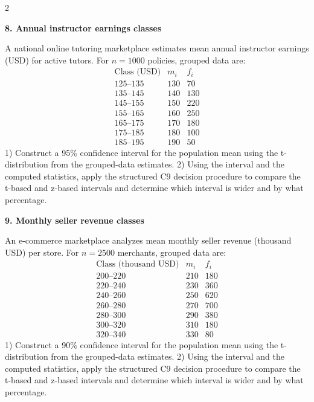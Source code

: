 \documentclass[12pt]{article}
\newcommand{\SubsectionBox}[1]{%
\noindent\colorbox{gray!30}{%
\parbox{\dimexpr\linewidth-2\fboxsep\relax}{\textbf{#1}}%
}\par\vspace{0.35cm}%
}
\begin{document}
\begin{multicols}{2}
		\vspace{0.25cm}
		\SubsectionBox{8. Annual instructor earnings classes}\vspace{-0.25cm}
		A national online tutoring marketplace estimates mean annual instructor earnings (USD) for active tutors.
		For $n=1000$ policies, grouped data are:
		\[
		\begin{array}{c|c|c}
		\text{Class (USD)} & m_i & f_i\\\hline
		125\text{--}135 & 130 & 70\\
		135\text{--}145 & 140 & 130\\
		145\text{--}155 & 150 & 220\\
		155\text{--}165 & 160 & 250\\
		165\text{--}175 & 170 & 180\\
		175\text{--}185 & 180 & 100\\
		185\text{--}195 & 190 & 50
		\end{array}
		\]
		1) Construct a 95\% confidence interval for the population mean using the t-distribution from the grouped-data estimates.
		2) Using the interval and the computed statistics, apply the structured C9 decision procedure to compare the t-based and z-based intervals and determine which interval is wider and by what percentage.
		
		\vspace{0.25cm}
		\SubsectionBox{9. Monthly seller revenue classes}\vspace{-0.25cm}
		An e-commerce marketplace analyzes mean monthly seller revenue (thousand USD) per store.
		For $n=2500$ merchants, grouped data are:
		\[
		\begin{array}{c|c|c}
		\text{Class (thousand USD)} & m_i & f_i\\\hline
		200\text{--}220 & 210 & 180\\
		220\text{--}240 & 230 & 360\\
		240\text{--}260 & 250 & 620\\
		260\text{--}280 & 270 & 700\\
		280\text{--}300 & 290 & 380\\
		300\text{--}320 & 310 & 180\\
		320\text{--}340 & 330 & 80
		\end{array}
		\]
		1) Construct a 90\% confidence interval for the population mean using the t-distribution from the grouped-data estimates.
		2) Using the interval and the computed statistics, apply the structured C9 decision procedure to compare the t-based and z-based intervals and determine which interval is wider and by what percentage.
		

\end{multicols}
\end{document}
